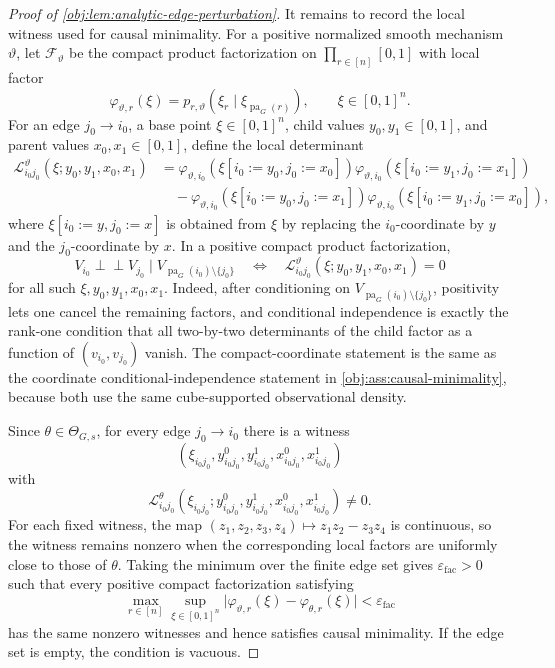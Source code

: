 \begin{proof}[Proof of \cref{obj:lem:analytic-edge-perturbation}]
It remains to record the local witness used for causal minimality.  For a positive normalized smooth mechanism \(\vartheta\), let \(\mathcal F_\vartheta\) be the compact product factorization on \(\prod_{r\in[n]}[0,1]\) with local factor
\[
\varphi_{\vartheta,r}(\xi)=p_{r,\vartheta}(\xi_r\mid \xi_{\operatorname{pa}_G(r)}),
\qquad \xi\in[0,1]^n.
\]
For an edge \(j_0\to i_0\), a base point \(\xi\in[0,1]^n\), child values \(y_0,y_1\in[0,1]\), and parent values \(x_0,x_1\in[0,1]\), define the local determinant
\[
\begin{aligned}
\mathcal L_{i_0j_0}^{\vartheta}(\xi;y_0,y_1,x_0,x_1)
&=\varphi_{\vartheta,i_0}(\xi[i_0:=y_0,j_0:=x_0])
  \varphi_{\vartheta,i_0}(\xi[i_0:=y_1,j_0:=x_1])\\
&\quad-\varphi_{\vartheta,i_0}(\xi[i_0:=y_0,j_0:=x_1])
  \varphi_{\vartheta,i_0}(\xi[i_0:=y_1,j_0:=x_0]),
\end{aligned}
\]
where \(\xi[i_0:=y,j_0:=x]\) is obtained from \(\xi\) by replacing the \(i_0\)-coordinate by \(y\) and the \(j_0\)-coordinate by \(x\).  In a positive compact product factorization,
\[
V_{i_0}\perp\!\!\!\perp V_{j_0}
\mid V_{\operatorname{pa}_G(i_0)\setminus\{j_0\}}
\quad\Longleftrightarrow\quad
\mathcal L_{i_0j_0}^{\vartheta}(\xi;y_0,y_1,x_0,x_1)=0
\]
for all such \(\xi,y_0,y_1,x_0,x_1\).  Indeed, after conditioning on \(V_{\operatorname{pa}_G(i_0)\setminus\{j_0\}}\), positivity lets one cancel the remaining factors, and conditional independence is exactly the rank-one condition that all two-by-two determinants of the child factor as a function of \((v_{i_0},v_{j_0})\) vanish.  The compact-coordinate statement is the same as the coordinate conditional-independence statement in \cref{obj:ass:causal-minimality}, because both use the same cube-supported observational density.

Since \(\theta\in\Theta_{G,s}\), for every edge \(j_0\to i_0\) there is a witness
\[
(\xi_{i_0j_0},y_{i_0j_0}^0,y_{i_0j_0}^1,x_{i_0j_0}^0,x_{i_0j_0}^1)
\]
with
\[
\mathcal L_{i_0j_0}^{\theta}
(\xi_{i_0j_0};y_{i_0j_0}^0,y_{i_0j_0}^1,
 x_{i_0j_0}^0,x_{i_0j_0}^1)\ne0 .
\]
For each fixed witness, the map \((z_1,z_2,z_3,z_4)\mapsto z_1z_2-z_3z_4\) is continuous, so the witness remains nonzero when the corresponding local factors are uniformly close to those of \(\theta\).  Taking the minimum over the finite edge set gives \(\varepsilon_{\mathrm{fac}}>0\) such that every positive compact factorization satisfying
\[
\max_{r\in[n]}\sup_{\xi\in[0,1]^n}
\bigl|\varphi_{\vartheta,r}(\xi)-\varphi_{\theta,r}(\xi)\bigr|<\varepsilon_{\mathrm{fac}}
\]
has the same nonzero witnesses and hence satisfies causal minimality.  If the edge set is empty, the condition is vacuous.


\end{proof}
